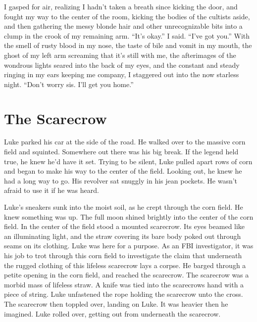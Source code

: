 I gasped for air, realizing I hadn't taken a breath since
kicking the door, and fought my way to the center of the room,
kicking the bodies of the cultists aside, and then gathering the
messy blonde hair and other unrecognizable bits into a clump in the
crook of my remaining arm. ``It's okay.'' I said.
``I've got you.'' With the smell of rusty blood in
my nose, the taste of bile and vomit in my mouth, the ghost of my
left arm screaming that it's still with me, the afterimages
of the wondrous lights seared into the back of my eyes, and the
constant and steady ringing in my ears keeping me company, I
staggered out into the now starless night. ``Don't worry
sis. I'll get you home.'' 
 



\chapter{The Scarecrow}


Luke parked his car at the side of the road. He walked over to the
massive corn field and squinted. Somewhere out there was his big
break. If the legend held true, he knew he'd have it set. Trying to
be silent, Luke pulled apart rows of corn and began to make his way
to the center of the field. Looking out, he knew he had a long way
to go. His revolver sat snuggly in his jean pockets. He wasn't
afraid to use it if he was heard.

Luke's sneakers sunk into the moist soil, as he crept through the
corn field. He knew something was up. The full moon shined brightly
into the center of the corn field. In the center of the field stood
a mounted scarecrow. Its eyes beamed like an illuminating light,
and the straw covering its bare body poked out through seams on its
clothing. Luke was here for a purpose. As an FBI investigator, it
was his job to trot through this corn field to investigate the
claim that underneath the rugged clothing of this lifeless
scarecrow lays a corpse. He barged through a petite opening in the
corn field, and reached the scarecrow. The scarecrow was a morbid
mass of lifeless straw. A knife was tied into the scarecrows hand
with a piece of string. Luke unfastened the rope holding the
scarecrow unto the cross. The scarecrow then toppled over, landing
on Luke. It was heavier then he imagined. Luke rolled over, getting
out from underneath the scarecrow.

